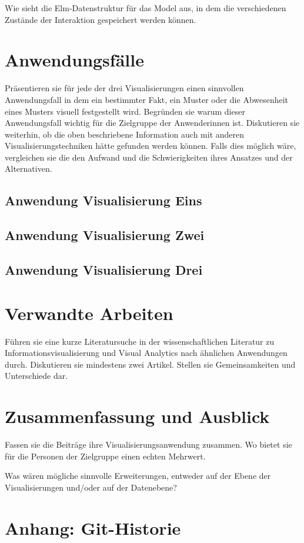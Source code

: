 \documentclass[usegeometry=true]{scrartcl}
\begin{document}
Wie sieht die Elm-Datenstruktur für das Model aus, in dem die verschiedenen Zustände der Interaktion gespeichert werden können.

\section{Anwendungsfälle}
Präsentieren sie für jede der drei Visualisierungen einen sinnvollen Anwendungsfall in dem ein bestimmter Fakt, ein Muster oder die Abwesenheit eines Musters visuell festgestellt wird. Begründen sie warum dieser Anwendungsfall wichtig für die Zielgruppe der Anwenderinnen ist. Diskutieren sie weiterhin, ob die oben beschriebene Information auch mit anderen Visualisierungstechniken hätte gefunden werden können. Falls dies möglich wäre, vergleichen sie die den Aufwand und die Schwierigkeiten ihres Ansatzes und der Alternativen. 
\subsection{Anwendung Visualisierung Eins}
\subsection{Anwendung Visualisierung Zwei}
\subsection{Anwendung Visualisierung Drei}

\section{Verwandte Arbeiten}
Führen sie eine kurze Literatursuche in der wissenschaftlichen Literatur zu Informationsvisualisierung und Visual Analytics nach ähnlichen Anwendungen durch. Diskutieren sie mindestens zwei Artikel. Stellen sie Gemeinsamkeiten und Unterschiede dar.

\section{Zusammenfassung und Ausblick}
Fassen sie die Beiträge ihre Visualisierungsanwendung zusammen. Wo bietet sie für die Personen der Zielgruppe einen echten Mehrwert.

Was wären mögliche sinnvolle Erweiterungen, entweder auf der Ebene der Visualisierungen und/oder auf der Datenebene?

\section*{Anhang: Git-Historie}
\newpage

\end{document}
